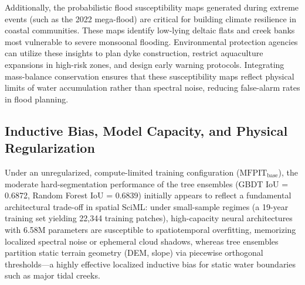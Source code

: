 \documentclass[preprint,12pt]{elsarticle}
\begin{document}
Additionally, the probabilistic flood susceptibility maps generated during extreme events (such as the 2022 mega-flood) are critical for building climate resilience in coastal communities. These maps identify low-lying deltaic flats and creek banks most vulnerable to severe monsoonal flooding. Environmental protection agencies can utilize these insights to plan dyke construction, restrict aquaculture expansions in high-risk zones, and design early warning protocols. Integrating mass-balance conservation ensures that these susceptibility maps reflect physical limits of water accumulation rather than spectral noise, reducing false-alarm rates in flood planning.

\subsection{Inductive Bias, Model Capacity, and Physical Regularization}
Under an unregularized, compute-limited training configuration ($\text{MFPIT}_{\text{base}}$), the moderate hard-segmentation performance of the tree ensembles (GBDT IoU = 0.6872, Random Forest IoU = 0.6839) initially appears to reflect a fundamental architectural trade-off in spatial SciML: under small-sample regimes (a 19-year training set yielding 22,344 training patches), high-capacity neural architectures with 6.58M parameters are susceptible to spatiotemporal overfitting, memorizing localized spectral noise or ephemeral cloud shadows, whereas tree ensembles partition static terrain geometry (DEM, slope) via piecewise orthogonal thresholds---a highly effective localized inductive bias for static water boundaries such as major tidal creeks.
\end{document}
